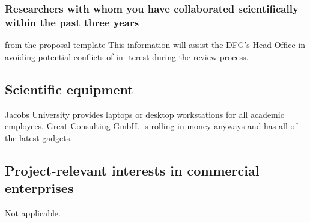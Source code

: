 \subsubsection{Researchers with whom you have collaborated scientifically within the past three years }


\begin{todo}{from the proposal template}
This information will assist the DFG’s Head Office in avoiding potential conflicts of in-
terest during the review process.
\end{todo}


\subsection{Scientific equipment }

Jacobs University provides laptops or desktop workstations for all academic
employees. Great Consulting GmbH. is rolling in money anyways and has all of the latest
gadgets.


\subsection{Project-relevant interests in commercial enterprises }

Not applicable.


